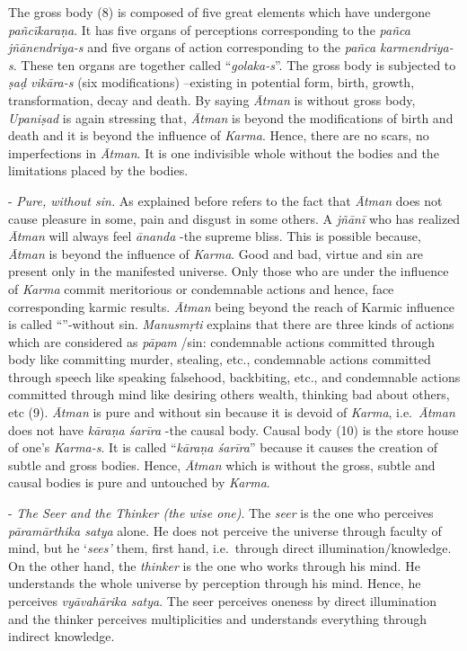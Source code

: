 The gross body (8) is composed of five great elements which have undergone \emph{pañcīkaraṇa}. It has five organs of perceptions corresponding to the \emph{pañca jñānendriya-s} and five organs of action corresponding to the \emph{pañca karmendriya-s}. These ten organs are together called ``\emph{golaka-s}''. The gross body is subjected to \emph{ṣaḍ vikāra-s} (six modifications) --existing in potential form, birth, growth, transformation, decay and death. By saying \emph{Ātman} is without gross body, \emph{Upaniṣad} is again stressing that, \emph{Ātman} is beyond the modifications of birth and death and it is beyond the influence of \emph{Karma}. Hence, there are no scars, no imperfections in \emph{Ātman}. It is one indivisible whole without the bodies and the limitations placed by the bodies.

- \emph{Pure, without sin.} As explained before  refers to the fact that \emph{Ātman} does not cause pleasure in some, pain and disgust in some others. A \emph{jñānī} who has realized \emph{Ātman} will always feel \emph{ānanda} -the supreme bliss. This is possible because, \emph{Ātman} is beyond the influence of \emph{Karma}. Good and bad, virtue and sin are present only in the manifested universe. Only those who are under the influence of \emph{Karma} commit meritorious or condemnable actions and hence, face corresponding karmic results. \emph{Ātman} being beyond the reach of Karmic influence is called ``''-without sin. \emph{Manusmṛti} explains that there are three kinds of actions which are considered as \emph{pāpam} /sin: condemnable actions committed through body like committing murder, stealing, etc., condemnable actions committed through speech like speaking falsehood, backbiting, etc., and condemnable actions committed through mind like desiring others wealth, thinking bad about others, etc (9). \emph{Ātman} is pure and without sin because it is devoid of \emph{Karma}, i.e.\ \emph{Ātman} does not have \emph{kāraṇa śarīra} -the causal body. Causal body (10) is the store house of one's \emph{Karma-s}. It is called ``\emph{kāraṇa śarīra}'' because it causes the creation of subtle and gross bodies. Hence, \emph{Ātman} which is without the gross, subtle and causal bodies is pure and untouched by \emph{Karma}.

 - \emph{The Seer and the Thinker (the wise one)}. The \emph{seer} is the one who perceives \emph{pāramārthika satya} alone. He does not perceive the universe through faculty of mind, but he `\emph{sees'} them, first hand, i.e.\ through direct illumination/knowledge. On the other hand, the \emph{thinker} is the one who works through his mind. He understands the whole universe by perception through his mind. Hence, he perceives \emph{vyāvahārika satya}. The seer perceives oneness by direct illumination and the thinker perceives multiplicities and understands everything through indirect knowledge.

